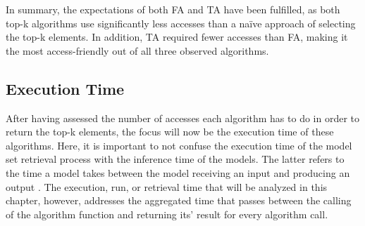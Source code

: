 In summary, the expectations of both FA and TA have been fulfilled, as both top-k algorithms use significantly less accesses than a naïve approach of selecting the top-k elements. In addition, TA required fewer accesses than FA, making it the most access-friendly out of all three observed algorithms. 



\subsection{Execution Time}

After having assessed the number of accesses each algorithm has to do in order to return the top-k elements, the focus will now be the execution time of these algorithms. Here, it is important to not confuse the execution time of the model set retrieval process with the inference time of the models. The latter refers to the time a model takes between the model receiving an input and producing an output \cite{marco2019}. The execution, run, or retrieval time that will be analyzed in this chapter, however, addresses the aggregated time that passes between the calling of the algorithm function and returning its' result for every algorithm call. 

